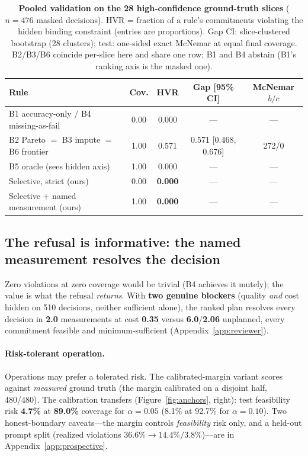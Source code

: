 \documentclass{article} %
\begin{document}
\begin{table}[t]
\centering
\caption{\textbf{Pooled validation on the 28 high-confidence ground-truth slices} ($n{=}476$ masked decisions). HVR = fraction of a rule's commitments violating the hidden binding constraint (entries are proportions). Gap CI: slice-clustered bootstrap (28 clusters); test: one-sided exact McNemar at equal final coverage. B2/B3/B6 coincide per-slice here and share one row; B1 and B4 abstain (B1's ranking axis is the masked one).}
\label{tab:flagship}
\footnotesize
\begin{tabular}{lcccc}
\toprule
Rule & Cov. & HVR & Gap [95\% CI] & McNemar $b/c$ \\
\midrule
B1 accuracy-only $/$ B4 missing-as-fail & 0.00 & 0.000 & --- & --- \\
B2 Pareto $=$ B3 impute $=$ B6 frontier & 1.00 & 0.571 & 0.571 [0.468, 0.676] & 272/0 \\
B5 oracle (sees hidden axis) & 1.00 & 0.000 & --- & --- \\
Selective, strict (ours) & 0.00 & \textbf{0.000} & --- & --- \\
Selective + named measurement (ours) & 1.00 & \textbf{0.000} & --- & --- \\
\bottomrule
\end{tabular}
\end{table}

\subsection{The refusal is informative: the named measurement resolves the decision}
\label{sec:acq}

 Zero violations at zero coverage would be trivial (B4 achieves it mutely); the value is what the refusal \emph{returns}. With \textbf{two genuine blockers} (quality \emph{and} cost hidden on 510 decisions, neither sufficient alone), the ranked plan resolves every decision in \textbf{2.0} measurements at cost \textbf{0.35} versus \textbf{6.0}/\textbf{2.06} unplanned, every commitment feasible and minimum-sufficient (Appendix~\ref{app:reviewer}).


\paragraph{Risk-tolerant operation.}
Operations may prefer a tolerated risk. The calibrated-margin variant scores against \emph{measured} ground truth (the margin calibrated on a disjoint half, 480/480). The calibration transfers (Figure~\ref{fig:anchors}, right): test feasibility risk \textbf{4.7\%} at \textbf{89.0\%} coverage for $\alpha{=}0.05$ (8.1\% at 92.7\% for $\alpha{=}0.10$). Two honest-boundary caveats---the margin controls \emph{feasibility} risk only, and a held-out prompt split (realized violations $36.6\%\!\to\!14.4\%/3.8\%$)---are in Appendix~\ref{app:prospective}.
\end{document}
